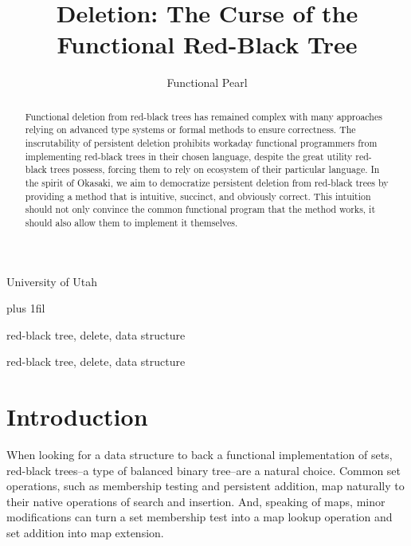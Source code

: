\documentclass[preprint]{sigplanconf}
\begin{document}
\copyrightdata{[to be supplied]} 


\title{Deletion: The Curse of the Functional Red-Black Tree}
\subtitle{Functional Pearl}

           {University of Utah}

\maketitle

\rightcodeskip=0pt plus 1fil 

\begin{abstract}
Functional deletion from red-black trees has remained complex with many approaches relying on advanced type systems or formal methods to ensure correctness. The inscrutability of persistent deletion prohibits workaday functional programmers from implementing red-black trees in their chosen language, despite the great utility red-black trees possess, forcing them to rely on ecosystem of their particular language. In the spirit of Okasaki, we aim to democratize persistent deletion from red-black trees by providing a method that is intuitive, succinct, and obviously correct. This intuition should not only convince the common functional program that the method works, it should also allow them to implement it themselves.
\end{abstract}


\terms
red-black tree, delete, data structure

\keywords
red-black tree, delete, data structure

\section{Introduction}

When looking for a data structure to back a functional implementation of sets, red-black trees--a type of balanced binary tree--are a natural choice. Common set operations, such as membership testing and persistent addition, map naturally to their native operations of search and insertion. And, speaking of maps, minor modifications can turn a set membership test into a map lookup operation and set addition into map extension.
\end{document}
